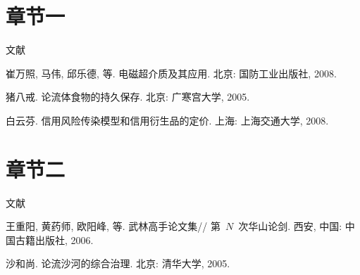 \documentclass[twoside]{article}
\begin{document}

\section{章节一}
文献\cite{Meta_CN,zhubajie}

\begin{thebibliography}{99}
崔万照, 马伟, 邱乐德, 等.
\newblock 电磁超介质及其应用\allowbreak[M].
\newblock 北京: 国防工业出版社, 2008.

猪八戒.
\newblock 论流体食物的持久保存\allowbreak[Z].
\newblock 北京: 广寒宫大学, 2005.

白云芬.
\newblock 信用风险传染模型和信用衍生品的定价\allowbreak[D].
\newblock 上海: 上海交通大学, 2008.
\end{thebibliography}

\section{章节二}

文献\cite{cnproceed,shaheshang}

\begin{thebibliography}{99}
王重阳, 黄药师, 欧阳峰, 等.
\newblock 武林高手论文集\allowbreak[C]//\allowbreak
第~$N$~次华山论剑.
\newblock 西安, 中国: 中国古籍出版社, 2006.

沙和尚.
\newblock 论流沙河的综合治理\allowbreak[Z].
\newblock 北京: 清华大学, 2005.
\end{thebibliography}
\end{document}

